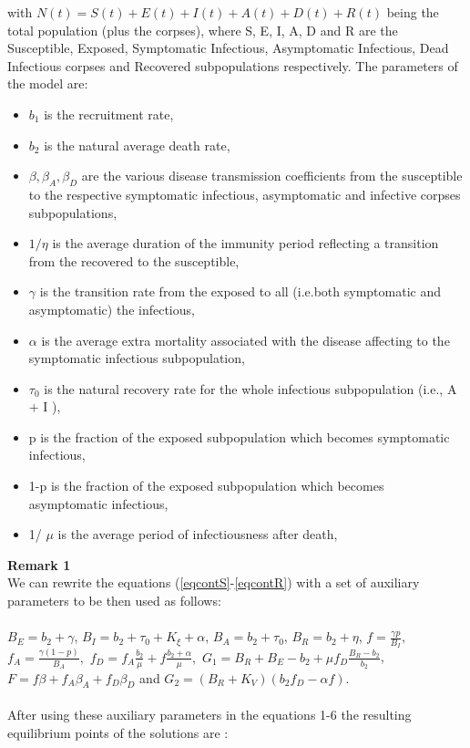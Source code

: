 \documentclass[10pt,a4paper]{article}
\begin{document}
with $N(t)=S(t)+E(t)+I(t)+A(t)+D(t)+R(t)$ being the total population (plus the corpses), where S, E, I, A, D and R are the Susceptible, Exposed, Symptomatic Infectious, Asymptomatic Infectious, Dead Infectious corpses and Recovered subpopulations respectively.
The parameters of the model are:
\begin{itemize}
	\item{$b_1$} is the recruitment rate,
	\item{$b_2$} is the natural average death rate,
	\item{$ \beta,\beta_A,\beta_D$} are the various disease transmission coefficients from the susceptible to the respective symptomatic infectious, asymptomatic and infective corpses subpopulations,
	\item{$1/\eta$} is the average duration of the immunity period reflecting a transition from the recovered to the susceptible,
	\item{$\gamma$} is the transition rate from the exposed to all (i.e.both symptomatic and asymptomatic) the infectious,
	\item{$\alpha$} is the average extra mortality associated with the disease affecting to the symptomatic infectious subpopulation,
	\item{$\tau_0$} is the natural recovery rate for the whole infectious subpopulation (i.e., A + I ),
	\item{p} is the fraction of the exposed subpopulation which becomes symptomatic infectious,
	\item{1-p} is the fraction of the exposed subpopulation which becomes asymptomatic infectious,
	\item{1/ $\mu$ } is the average period of infectiousness after death,
\end{itemize}
\textbf{Remark 1} \\
We can rewrite the equations (\ref{eqcontS}-\ref{eqcontR}) with a set of auxiliary parameters to be then used as follows:\\\\
$B_E=b_2+\gamma$, $B_I=b_2+\tau_0+K_\xi+\alpha$, $B_A=b_2+\tau_0$, $B_R=b_2+\eta$,
$f=\frac{\gamma p }{B_I},$  $f_A=\frac{\gamma(1-p)}{B_A},$ $f_D=f_A\frac{b_2}{\mu}+f\frac{b_2+\alpha}{\mu},$ 
$G_1=B_R+B_E-b_2+\mu f_D \frac{B_R-b_2}{b_2}$, $F=f\beta+f_A\beta_A+f_D\beta_D$ and $G_2=(B_R+K_V)(b_2 f_D-\alpha f)$.\\\\
	After using these auxiliary parameters in the equations 1-6 the resulting equilibrium points of the solutions are :
\end{document}
